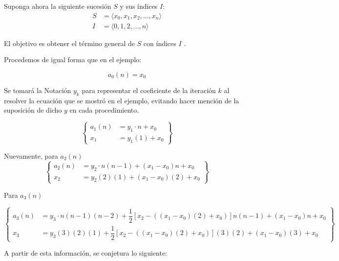 
Suponga ahora la siguiente sucesión $S$ y sus índices $I$:
\begin{align*}
    S &= \langle x_0, x_1, x_2, \dots , x_n\rangle\\
    I &= \langle 0, 1, 2, \dots , n \rangle
\end{align*}

El objetivo es obtener el término general de $S$ con índices $I$ .

Procedemos de igual forma que en el ejemplo:

\[a_0(n) = x_0\]

Se tomará la Notación $y_k$ para representar el coeficiente de la iteración $k$ al resolver la ecuación que se mostró en el ejemplo, evitando hacer mención de la suposición de dicho $y$ en cada procedimiento.

\begin{equation*}
    \left\{
        \begin{aligned}
            a_1(n) &= y_1 \cdot n + x_0\\
            x_1 &= y_1(1) + x_0
        \end{aligned}
    \right\}
\end{equation*}

Nuevamente, para $a_2(n)$
\begin{equation*}
    \left\{
        \begin{aligned}
            a_2(n) &= y_2 \cdot n(n-1) + (x_1 - x_0)n + x_0\\
            x_2 &= y_2(2)(1) + (x_1 - x_0)(2) + x_0
        \end{aligned}  
    \right\}
\end{equation*}

Para $a_3(n)$

\begin{equation*}
    \left\{
        \begin{aligned}
            a_3(n) &= y_3 \cdot n(n-1)(n-2) + \dfrac{1}{2}[x_2 - ((x_1  - x_0)(2) + x_0)]n(n-1) + (x_1 - x_0)n + x_0\\
            x_3 &= y_3 (3)(2)(1) + \dfrac{1}{2}[x_2 - ((x_1  - x_0)(2) + x_0)](3)(2) + (x_1 - x_0)(3) + x_0
        \end{aligned}
    \right\}
\end{equation*}

A partir de esta información, se conjetura lo siguiente:

